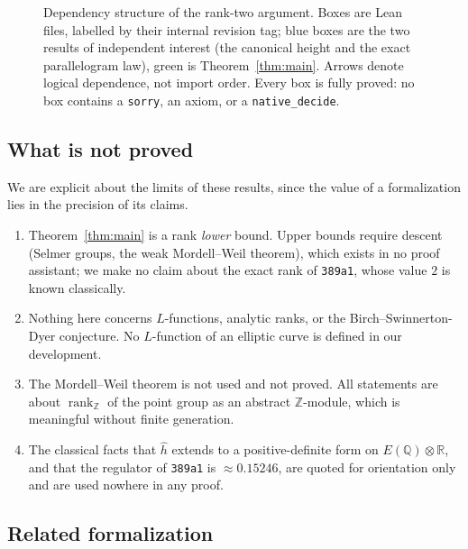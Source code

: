 \documentclass[11pt,reqno]{amsart}
\newcommand{\pffig}[1]{}
\theoremstyle{plain}
\theoremstyle{definition}
\theoremstyle{remark}
\DeclareRobustCommand{\lt}[1]{\texttt{#1}}
\newcommand{\hh}{\widehat{h}}
\begin{document}
\begin{figure}[htbp]
\centering
\pffig{fig_arc_dag}
\caption{Dependency structure of the rank-two argument. Boxes are Lean files,
labelled by their internal revision tag; blue boxes are the two results of
independent interest (the canonical height and the exact parallelogram law),
green is Theorem~\ref{thm:main}. Arrows denote logical dependence, not
import order. Every box is fully proved: no box contains a \lt{sorry}, an
axiom, or a \lt{native\_decide}.}
\label{fig:dag}
\end{figure}

\subsection{What is not proved}

We are explicit about the limits of these results, since the value of a
formalization lies in the precision of its claims.

\begin{enumerate}[label=\textup{(\alph*)}]
  \item Theorem~\ref{thm:main} is a rank \emph{lower} bound. Upper bounds
        require descent (Selmer groups, the weak Mordell--Weil theorem),
        which exists in no proof assistant; we make no claim about the exact
        rank of \texttt{389a1}, whose value $2$ is known classically.
  \item Nothing here concerns $L$-functions, analytic ranks, or the
        Birch--Swinnerton-Dyer conjecture. No $L$-function of an elliptic
        curve is defined in our development.
  \item The Mordell--Weil theorem is not used and not proved. All statements
        are about $\operatorname{rank}_{\mathbb{Z}}$ of the point group as an
        abstract $\mathbb{Z}$-module, which is meaningful without finite
        generation.
  \item The classical facts that $\hh$ extends to a positive-definite form on
        $E(\mathbb{Q}) \otimes \mathbb{R}$, and that the regulator of
        \texttt{389a1} is $\approx 0.15246$, are quoted for orientation only
        and are used nowhere in any proof.
\end{enumerate}

\subsection{Related formalization}
\end{document}
